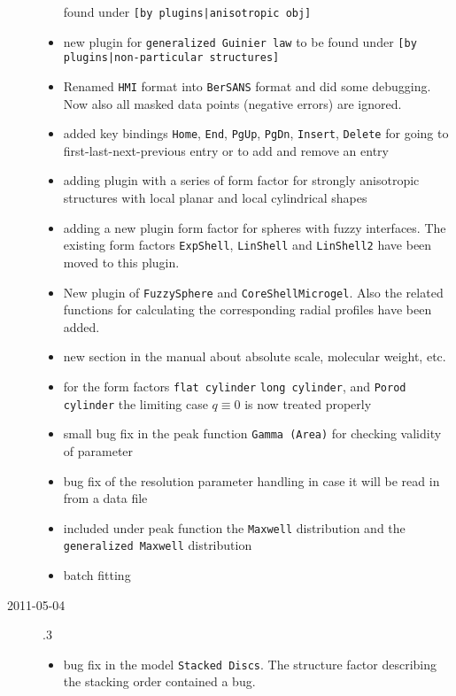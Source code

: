 \begin{description}
\begin{itemize}
            found under \texttt{[by plugins|anisotropic obj]}
      \item new plugin for \texttt{generalized Guinier law} to be found under
            \texttt{[by plugins|non-particular structures]}
      \item Renamed \texttt{HMI} format into \texttt{BerSANS} format and did some debugging.
            Now also all masked data points (negative errors) are ignored.
      \item added key bindings \texttt{Home}, \texttt{End}, \texttt{PgUp}, \texttt{PgDn}, \texttt{Insert},
            \texttt{Delete} for going to first-last-next-previous entry or to add and remove an entry
      \item adding plugin with a series of form factor for strongly anisotropic structures
            with local planar and local cylindrical shapes
      \item adding a new plugin form factor for spheres with fuzzy interfaces. The existing form factors
            \texttt{ExpShell}, \texttt{LinShell} and \texttt{LinShell2} have been moved to this plugin.
      \item New plugin of \texttt{FuzzySphere} and \texttt{CoreShellMicrogel}.
            Also the related functions for calculating the corresponding radial profiles have been added.
      \item new section in the manual about absolute scale, molecular weight, etc.
      \item for the form factors \texttt{flat cylinder} \texttt{long cylinder}, and \texttt{Porod cylinder}
            the limiting case $q \equiv 0$ is now treated properly
      \item small bug fix in the peak function \texttt{Gamma (Area)} for checking
            validity of parameter
      \item bug fix of the resolution parameter handling in case it will be read in from a data file
      \item included under peak function the \texttt{Maxwell} distribution and the
            \texttt{generalized Maxwell} distribution
      \item batch fitting
    \end{itemize}
    \item[2011-05-04] .3
        \begin{itemize}
        \item  bug fix in the model \texttt{Stacked Discs}. The structure factor describing the
            stacking order contained a bug.

\end{itemize}
\end{description}

